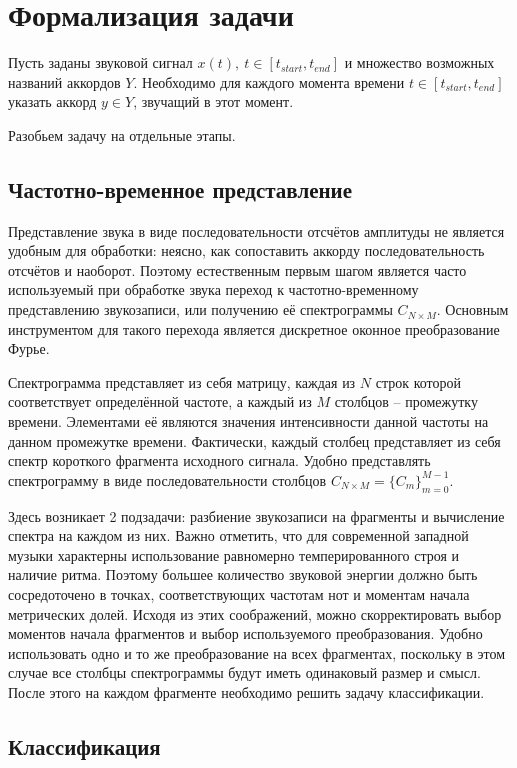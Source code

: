 \section{Формализация задачи} \label{sectT_task}

Пусть заданы звуковой сигнал $x(t),~t \in [t_{start}, t_{end}]$ и множество
возможных названий аккордов $Y$. Необходимо для каждого момента времени $t \in
[t_{start}, t_{end}]$ указать аккорд $y \in Y$, звучащий в этот момент.

Разобьем задачу на отдельные этапы.

\subsection{Частотно-временное представление}

Представление звука в виде последовательности отсчётов амплитуды не является
удобным для обработки: неясно, как сопоставить аккорду последовательность
отсчётов и наоборот. Поэтому естественным первым шагом является часто
используемый при обработке звука переход к частотно-временному представлению
звукозаписи, или получению её спектрограммы $C_{N \times M}$. Основным
инструментом для такого перехода является дискретное оконное преобразование
Фурье.

Спектрограмма представляет из себя матрицу, каждая из $N$ строк которой
соответствует определённой частоте, а каждый из $M$ столбцов -- промежутку
времени. Элементами её являются значения интенсивности данной частоты на данном
промежутке времени. Фактически, каждый столбец представляет из себя спектр
короткого фрагмента исходного сигнала. Удобно представлять спектрограмму в виде
последовательности столбцов $C_{N \times M} = \{C_m\}_{m=0}^{M-1}$.

Здесь возникает 2 подзадачи: разбиение звукозаписи на фрагменты и вычисление
спектра на каждом из них. Важно отметить, что для современной западной музыки
характерны использование равномерно темперированного строя и наличие ритма.
Поэтому большее количество звуковой энергии должно быть сосредоточено в точках,
соответствующих частотам нот и моментам начала метрических долей. Исходя из этих
соображений, можно скорректировать выбор моментов начала фрагментов и выбор
используемого преобразования. Удобно использовать одно и то же преобразование на
всех фрагментах, поскольку в этом случае все столбцы спектрограммы будут иметь
одинаковый размер и смысл. После этого на каждом фрагменте необходимо решить
задачу классификации.

\subsection{Классификация}

